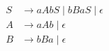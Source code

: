 
\setcounter{equation}{0}
\begin{align}
  S &\to aAbS \mid bBaS \mid \epsilon \\[8pt]
  A &\to aAb \mid \epsilon \\[8pt]
  B &\to bBa \mid \epsilon
\end{align}